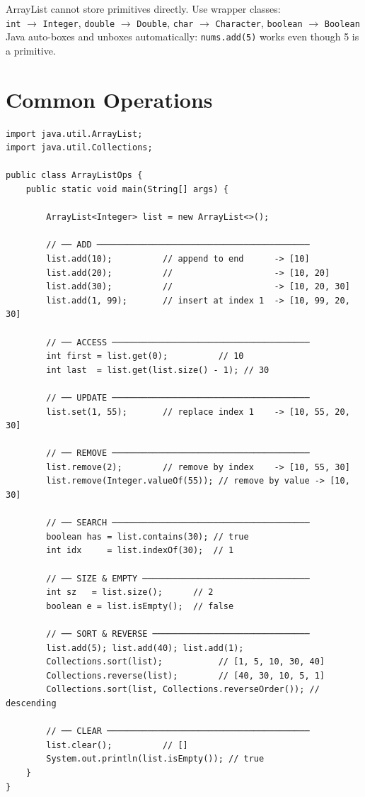 \documentclass[12pt,a4paper,oneside]{book}
\begin{document}
\begin{tipbox}
ArrayList cannot store primitives directly. Use wrapper classes:\\
\texttt{int} $\to$ \texttt{Integer}, \quad \texttt{double} $\to$ \texttt{Double}, \quad \texttt{char} $\to$ \texttt{Character}, \quad \texttt{boolean} $\to$ \texttt{Boolean}\\
Java auto-boxes and unboxes automatically: \texttt{nums.add(5)} works even though 5 is a primitive.
\end{tipbox}

\section{Common Operations}

\begin{lstlisting}[caption={ArrayList --- All Core Operations}]
import java.util.ArrayList;
import java.util.Collections;

public class ArrayListOps {
    public static void main(String[] args) {

        ArrayList<Integer> list = new ArrayList<>();

        // ── ADD ──────────────────────────────────────────
        list.add(10);          // append to end      -> [10]
        list.add(20);          //                    -> [10, 20]
        list.add(30);          //                    -> [10, 20, 30]
        list.add(1, 99);       // insert at index 1  -> [10, 99, 20, 30]

        // ── ACCESS ───────────────────────────────────────
        int first = list.get(0);          // 10
        int last  = list.get(list.size() - 1); // 30

        // ── UPDATE ───────────────────────────────────────
        list.set(1, 55);       // replace index 1    -> [10, 55, 20, 30]

        // ── REMOVE ───────────────────────────────────────
        list.remove(2);        // remove by index    -> [10, 55, 30]
        list.remove(Integer.valueOf(55)); // remove by value -> [10, 30]

        // ── SEARCH ───────────────────────────────────────
        boolean has = list.contains(30); // true
        int idx     = list.indexOf(30);  // 1

        // ── SIZE & EMPTY ─────────────────────────────────
        int sz   = list.size();      // 2
        boolean e = list.isEmpty();  // false

        // ── SORT & REVERSE ───────────────────────────────
        list.add(5); list.add(40); list.add(1);
        Collections.sort(list);           // [1, 5, 10, 30, 40]
        Collections.reverse(list);        // [40, 30, 10, 5, 1]
        Collections.sort(list, Collections.reverseOrder()); // descending

        // ── CLEAR ────────────────────────────────────────
        list.clear();          // []
        System.out.println(list.isEmpty()); // true
    }
}
\end{lstlisting}
\end{document}
